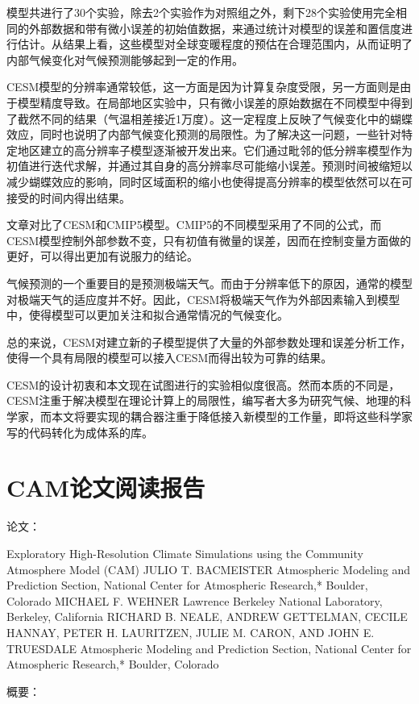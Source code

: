 模型共进行了30个实验，除去2个实验作为对照组之外，剩下28个实验使用完全相同的外部数据和带有微小误差的初始值数据，来通过统计对模型的误差和置信度进行估计。从结果上看，这些模型对全球变暖程度的预估在合理范围内，从而证明了内部气候变化对气候预测能够起到一定的作用。

CESM模型的分辨率通常较低，这一方面是因为计算复杂度受限，另一方面则是由于模型精度导致。在局部地区实验中，只有微小误差的原始数据在不同模型中得到了截然不同的结果（气温相差接近1万度）。这一定程度上反映了气候变化中的蝴蝶效应，同时也说明了内部气候变化预测的局限性。为了解决这一问题，一些针对特定地区建立的高分辨率子模型逐渐被开发出来。它们通过毗邻的低分辨率模型作为初值进行迭代求解，并通过其自身的高分辨率尽可能缩小误差。预测时间被缩短以减少蝴蝶效应的影响，同时区域面积的缩小也使得提高分辨率的模型依然可以在可接受的时间内得出结果。

文章对比了CESM和CMIP5模型。CMIP5的不同模型采用了不同的公式，而CESM模型控制外部参数不变，只有初值有微量的误差，因而在控制变量方面做的更好，可以得出更加有说服力的结论。


气候预测的一个重要目的是预测极端天气。而由于分辨率低下的原因，通常的模型对极端天气的适应度并不好。因此，CESM将极端天气作为外部因素输入到模型中，使得模型可以更加关注和拟合通常情况的气候变化。

总的来说，CESM对建立新的子模型提供了大量的外部参数处理和误差分析工作，使得一个具有局限的模型可以接入CESM而得出较为可靠的结果。

CESM的设计初衷和本文现在试图进行的实验相似度很高。然而本质的不同是，CESM注重于解决模型在理论计算上的局限性，编写者大多为研究气候、地理的科学家，而本文将要实现的耦合器注重于降低接入新模型的工作量，即将这些科学家写的代码转化为成体系的库。

\section{CAM论文阅读报告}

论文：

Exploratory High-Resolution Climate Simulations using the Community Atmosphere Model (CAM) JULIO T. BACMEISTER Atmospheric Modeling and Prediction Section, National Center for Atmospheric Research,* Boulder, Colorado MICHAEL F. WEHNER Lawrence Berkeley National Laboratory, Berkeley, California RICHARD B. NEALE, ANDREW GETTELMAN, CECILE HANNAY, PETER H. LAURITZEN, JULIE M. CARON, AND JOHN E. TRUESDALE Atmospheric Modeling and Prediction Section, National Center for Atmospheric Research,* Boulder, Colorado


概要：

